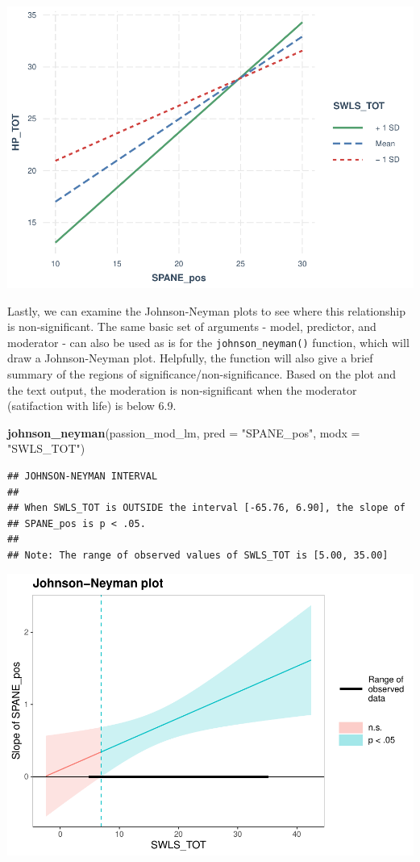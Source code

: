 \documentclass[
]{book}
\newenvironment{Shaded}{\begin{snugshade}}{\end{snugshade}}
\newcommand{\AttributeTok}[1]{\textcolor[rgb]{0.13,0.29,0.53}{#1}}
\newcommand{\FunctionTok}[1]{\textcolor[rgb]{0.13,0.29,0.53}{\textbf{#1}}}
\newcommand{\NormalTok}[1]{#1}
\newcommand{\StringTok}[1]{\textcolor[rgb]{0.31,0.60,0.02}{#1}}
\begin{document}
\includegraphics{_main_files/figure-latex/unnamed-chunk-366-1.pdf}

Lastly, we can examine the Johnson-Neyman plots to see where this relationship is non-significant. The same basic set of arguments - model, predictor, and moderator - can also be used as is for the \texttt{johnson\_neyman()} function, which will draw a Johnson-Neyman plot. Helpfully, the function will also give a brief summary of the regions of significance/non-significance. Based on the plot and the text output, the moderation is non-significant when the moderator (satifaction with life) is below 6.9.

\begin{Shaded}
\begin{Highlighting}[]
\FunctionTok{johnson\_neyman}\NormalTok{(passion\_mod\_lm, }\AttributeTok{pred =} \StringTok{"SPANE\_pos"}\NormalTok{, }\AttributeTok{modx =} \StringTok{"SWLS\_TOT"}\NormalTok{)}
\end{Highlighting}
\end{Shaded}

\begin{verbatim}
## JOHNSON-NEYMAN INTERVAL
## 
## When SWLS_TOT is OUTSIDE the interval [-65.76, 6.90], the slope of
## SPANE_pos is p < .05.
## 
## Note: The range of observed values of SWLS_TOT is [5.00, 35.00]
\end{verbatim}

\includegraphics{_main_files/figure-latex/unnamed-chunk-367-1.pdf}
\end{document}
